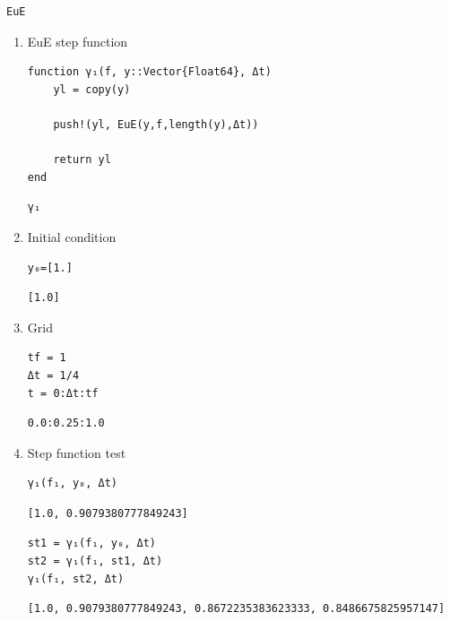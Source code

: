 \documentclass[11pt]{article}
\begin{document}
\begin{enumerate}
\begin{enumerate}
\begin{enumerate}
\begin{verbatim}
EuE
\end{verbatim}

\begin{enumerate}
\item EuE step function
\label{sec:org9acaf11}
\begin{verbatim}
function γ₁(f, y::Vector{Float64}, Δt)
    yl = copy(y)

    push!(yl, EuE(y,f,length(y),Δt))

    return yl
end
\end{verbatim}

\begin{verbatim}
γ₁
\end{verbatim}

\item Initial condition
\label{sec:org0f2676e}
\begin{verbatim}
y₀=[1.]
\end{verbatim}

\begin{verbatim}
[1.0]
\end{verbatim}
\item Grid
\label{sec:org001147a}
\begin{verbatim}
tf = 1
Δt = 1/4
t = 0:Δt:tf
\end{verbatim}

\begin{verbatim}
0.0:0.25:1.0
\end{verbatim}

\item Step function test
\label{sec:orge2f6c55}
\begin{verbatim}
γ₁(f₁, y₀, Δt)
\end{verbatim}

\begin{verbatim}
[1.0, 0.9079380777849243]
\end{verbatim}


\begin{verbatim}
st1 = γ₁(f₁, y₀, Δt)
st2 = γ₁(f₁, st1, Δt)
γ₁(f₁, st2, Δt)
\end{verbatim}

\begin{verbatim}
[1.0, 0.9079380777849243, 0.8672235383623333, 0.8486675825957147]
\end{verbatim}
\end{enumerate}


\end{enumerate}
\end{enumerate}
\end{enumerate}
\end{document}
